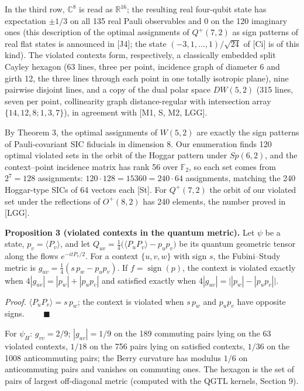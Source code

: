 \documentclass[11pt,a4paper]{article}
\begin{document}
In the third row, \(\mathbb{C}^8\) is read as \(\mathbb{R}^{16}\); the resulting real four-qubit state has
expectation \(\pm 1/3\) on all 135 real Pauli observables and \(0\) on the 120 imaginary ones (this
description of the optimal assignments of \(Q^+(7,2)\) as sign patterns of real flat states is
announced in {[}J4{]}; the state \((-3,1,\dots,1)/\sqrt{24}\) of {[}Ci{]} is of this kind). The violated contexts
form, respectively, a classically embedded split Cayley
hexagon (63 lines, three per point, incidence graph of diameter 6 and girth 12, the three lines through
each point in one totally isotropic plane), nine pairwise disjoint lines, and a copy of the dual polar
space \(DW(5,2)\) (315 lines, seven per point, collinearity graph distance-regular with intersection
array \(\{14,12,8;1,3,7\}\)), in agreement with {[}M1, S, M2, LGG{]}.

By Theorem 3, the optimal assignments of \(W(5,2)\) are exactly the sign patterns of Pauli-covariant SIC
fiducials in dimension 8. Our enumeration finds 120 optimal violated sets in the orbit of the Hoggar
pattern under \(Sp(6,2)\), and the context--point incidence matrix has rank 56 over \(\mathbb{F}_2\), so each
set comes from \(2^7 = 128\) assignments: \(120 \cdot 128 = 15360 = 240 \cdot 64\) assignments, matching the
240 Hoggar-type SICs of 64 vectors each {[}St{]}. For \(Q^+(7,2)\) the orbit of our violated set under the
reflections of \(O^+(8,2)\) has 240 elements, the number proved in {[}LGG{]}.

\textbf{Proposition 3 (violated contexts in the quantum metric).} Let \(\psi\) be a state, \(p_v = \langle P_v\rangle\),
and let \(Q_{uv} = \tfrac14\big(\langle P_u P_v\rangle - p_u p_v\big)\) be its quantum geometric tensor along
the flows \(e^{-itP_v/2}\). For a context \(\{u, v, w\}\) with sign \(s\), the Fubini--Study metric is
\(g_{uv} = \tfrac14 (s\,p_w - p_u p_v)\). If \(f = \operatorname{sign}(p)\), the context is violated exactly when
\(4|g_{uv}| = |p_w| + |p_u p_v|\) and satisfied exactly when \(4|g_{uv}| = \big||p_w| - |p_u p_v|\big|\).

\emph{Proof.} \(\langle P_uP_v\rangle = s\,p_w\); the context is violated when \(s\,p_w\) and \(p_u p_v\) have opposite
signs. \(\qquad\blacksquare\)

For \(\psi_H\): \(g_{vv} = 2/9\); \(|g_{uv}| = 1/9\) on the 189 commuting pairs lying on the 63 violated contexts,
\(1/18\) on the 756 pairs lying on satisfied contexts, \(1/36\) on the 1008 anticommuting pairs; the Berry
curvature has modulus \(1/6\) on anticommuting pairs and vanishes on commuting ones. The hexagon is the
set of pairs of largest off-diagonal metric (computed with the QGTL kernels, Section 9).
\end{document}
